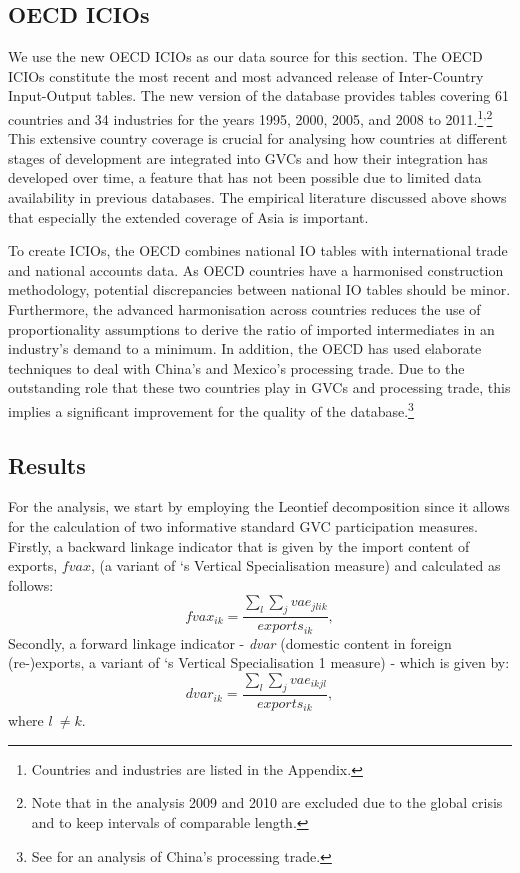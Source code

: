 \documentclass[a4paper,11pt]{article}
\begin{document}
\subsection{OECD ICIOs}\label{sub:icios}
We use the new OECD ICIOs as our data source for this section. The OECD ICIOs constitute the most recent and most advanced release of Inter-Country Input-Output tables. The new version of the database provides tables covering 61 countries and 34 industries for the years 1995, 2000, 2005, and 2008 to 2011.\footnote{Countries and industries are listed in the Appendix.}\textsuperscript{,}\footnote{Note that in the analysis 2009 and 2010 are excluded due to the global crisis and to keep intervals of comparable length.} This extensive country coverage is crucial for analysing how countries at different stages of development are integrated into GVCs and how their integration has developed over time, a feature that has not been possible due to limited data availability in previous databases. The empirical literature discussed above shows that especially the extended coverage of Asia is important. 

To create ICIOs, the OECD combines national IO tables with international trade and national accounts data. As OECD countries have a harmonised construction methodology, potential discrepancies between national IO tables should be minor. Furthermore, the advanced harmonisation across countries reduces the use of proportionality assumptions to derive the ratio of imported intermediates in an industry's demand to a minimum. In addition, the OECD has used elaborate techniques to deal with China's and Mexico's processing trade. Due to the outstanding role that these two countries play in GVCs and processing trade, this implies a significant improvement for the quality of the database.\footnote{See \citet{rokoetal12} for an analysis of China's processing trade.}

\subsection{Results}\label{sub:results}
For the analysis, we start by employing the Leontief decomposition since it allows for the calculation of two informative standard GVC participation measures. Firstly, a backward linkage indicator that is given by the import content of exports, $fvax$, (a variant of \citet{dahuetal01}`s Vertical Specialisation measure) and calculated as follows:
\begin{equation}
fvax_{ik} = \frac{\sum_{l}{\sum_{j}vae_{jlik}}}{exports_{ik}} ,
\end{equation}
Secondly, a forward linkage indicator - \emph{dvar} (domestic content in foreign (re-)exports, a variant of \citet{dahuetal01}`s Vertical Specialisation 1 measure) - which is given by:
\begin{equation}\label{eq:dvar}
{dvar}_{ik} = \frac{\sum_{l}{\sum_{j} vae_{ikjl}}}{exports_{ik}} ,
\end{equation}
where \(l\  \neq k\).
\end{document}

